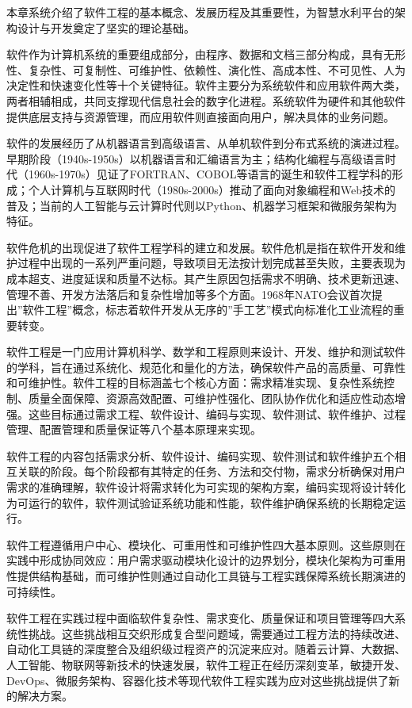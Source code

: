 \documentclass[12pt,a4paper]{article}
\begin{document}
本章系统介绍了软件工程的基本概念、发展历程及其重要性，为智慧水利平台的架构设计与开发奠定了坚实的理论基础。

软件作为计算机系统的重要组成部分，由程序、数据和文档三部分构成，具有无形性、复杂性、可复制性、可维护性、依赖性、演化性、高成本性、不可见性、人为决定性和快速变化性等十个关键特征。软件主要分为系统软件和应用软件两大类，两者相辅相成，共同支撑现代信息社会的数字化进程。系统软件为硬件和其他软件提供底层支持与资源管理，而应用软件则直接面向用户，解决具体的业务问题。

软件的发展经历了从机器语言到高级语言、从单机软件到分布式系统的演进过程。早期阶段（1940s-1950s）以机器语言和汇编语言为主；结构化编程与高级语言时代（1960s-1970s）见证了FORTRAN、COBOL等语言的诞生和软件工程学科的形成；个人计算机与互联网时代（1980s-2000s）推动了面向对象编程和Web技术的普及；当前的人工智能与云计算时代则以Python、机器学习框架和微服务架构为特征。

软件危机的出现促进了软件工程学科的建立和发展。软件危机是指在软件开发和维护过程中出现的一系列严重问题，导致项目无法按计划完成甚至失败，主要表现为成本超支、进度延误和质量不达标。其产生原因包括需求不明确、技术更新迅速、管理不善、开发方法落后和复杂性增加等多个方面。1968年NATO会议首次提出''软件工程''概念，标志着软件开发从无序的''手工艺''模式向标准化工业流程的重要转变。

软件工程是一门应用计算机科学、数学和工程原则来设计、开发、维护和测试软件的学科，旨在通过系统化、规范化和量化的方法，确保软件产品的高质量、可靠性和可维护性。软件工程的目标涵盖七个核心方面：需求精准实现、复杂性系统控制、质量全面保障、资源高效配置、可维护性强化、团队协作优化和适应性动态增强。这些目标通过需求工程、软件设计、编码与实现、软件测试、软件维护、过程管理、配置管理和质量保证等八个基本原理来实现。

软件工程的内容包括需求分析、软件设计、编码实现、软件测试和软件维护五个相互关联的阶段。每个阶段都有其特定的任务、方法和交付物，需求分析确保对用户需求的准确理解，软件设计将需求转化为可实现的架构方案，编码实现将设计转化为可运行的软件，软件测试验证系统功能和性能，软件维护确保系统的长期稳定运行。

软件工程遵循用户中心、模块化、可重用性和可维护性四大基本原则。这些原则在实践中形成协同效应：用户需求驱动模块化设计的边界划分，模块化架构为可重用性提供结构基础，而可维护性则通过自动化工具链与工程实践保障系统长期演进的可持续性。

软件工程在实践过程中面临软件复杂性、需求变化、质量保证和项目管理等四大系统性挑战。这些挑战相互交织形成复合型问题域，需要通过工程方法的持续改进、自动化工具链的深度整合及组织级过程资产的沉淀来应对。随着云计算、大数据、人工智能、物联网等新技术的快速发展，软件工程正在经历深刻变革，敏捷开发、DevOps、微服务架构、容器化技术等现代软件工程实践为应对这些挑战提供了新的解决方案。
\end{document}
